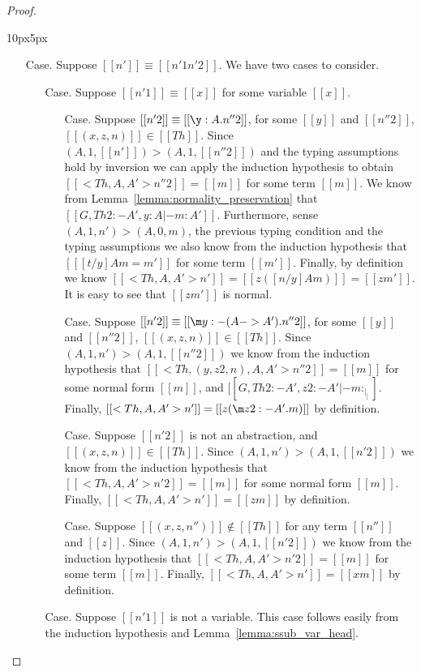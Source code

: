 \begin{proof}
\begin{changemargin}{10px}{5px}
\begin{itemize}
  \item[Case.] Suppose $[[n']] \equiv [[n'1 n'2]]$. We have two cases to consider.
    \begin{itemize}
    \item[Case.] Suppose $[[n'1]] \equiv [[x]]$ for some variable $[[x]]$.     
      \begin{itemize}
      \item[Case.] Suppose $[[n'2]] \equiv [[\y:A.n''2]]$, for some $[[y]]$ and $[[n''2]]$,
        $[[(x,z,n)]] \in [[Th]]$. Since 
        $(A,1,[[n']]) > (A,1,[[n''2]])$ and the typing assumptions
        hold by inversion we can apply the induction
        hypothesis to obtain $[[<Th,A,A'>n''2]] = [[m]]$ for some term $[[m]]$.
        We know from Lemma~\ref{lemma:normality_preservation} that 
        $[[G,Th 2:{-A'},y:A |- m : A']]$.
        Furthermore, sense $(A,1,n') > (A,0,m)$, the previous typing condition and
        the typing assumptions we also know from the induction hypothesis that 
        $[[ [t/y] A m = m' ]]$ for some term $[[m']]$. Finally, by definition we know 
        $[[<Th, A, A'>n']] = [[z ([n/y] A m)]] = [[z m']]$.  It is easy to see that
        $[[z m']]$ is normal.      

      \item[Case.] Suppose $[[n'2]] \equiv [[\m y:{-(A->A')}.n''2]]$, for some $[[y]]$ and 
        $[[n''2]]$, $[[(x,z,n)]] \in [[Th]]$. Since $(A,1,n') > (A,1,[[n''2]])$ we know from the 
        induction hypothesis that $[[<Th,(y,z2,n),A,A'>n''2]] = [[m]]$ for some normal form 
        $[[m]]$, and $[[G,Th 2:{-A'},z2:{-A'} |- m : _|_ ]]$.
        Finally, $[[<Th, A,A'>n']] = [[z (\m z2:{-A'}.m)]]$ by definition.

      \item[Case.] Suppose $[[n'2]]$ is not an abstraction, and $[[(x,z,n)]] \in [[Th]]$.  
        Since $(A,1,n') > (A,1,[[n'2]])$ we know from the 
        induction hypothesis that $[[<Th,A,A'>n'2]] = [[m]]$ for some normal form $[[m]]$.  Finally,
        $[[<Th, A,A'>n']] = [[z m]]$ by definition.      

      \item[Case.] Suppose $[[(x,z,n'')]] \not \in [[Th]]$ for any term $[[n'']]$ and $[[z]]$.  
        Since $(A,1,n') > (A,1,[[n'2]])$ we know from the 
        induction hypothesis that $[[<Th,A,A'>n'2]] = [[m]]$ for some term $[[m]]$.  Finally,
        $[[<Th, A,A'>n']] = [[x m]]$ by definition.      
      \end{itemize}
    \item[Case.] Suppose $[[n'1]]$ is not a variable.  This case follows easily from
      the induction hypothesis and Lemma~\ref{lemma:ssub_var_head}.
    \end{itemize}
  \end{itemize}
  \end{changemargin}
  

\end{proof}
